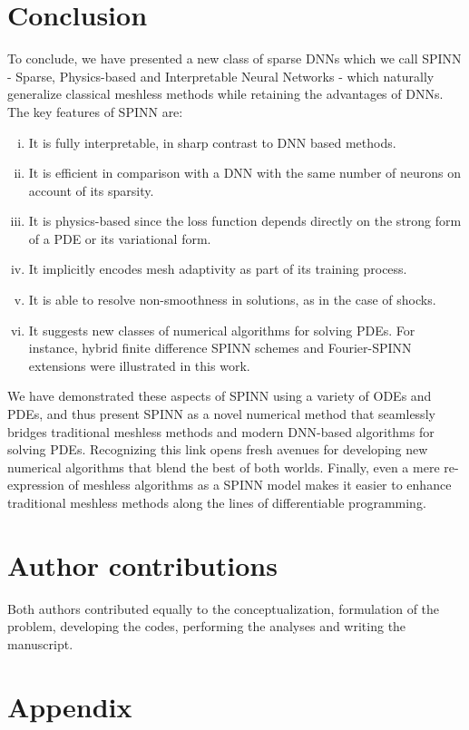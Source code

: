 \documentclass[12pt]{article}
\begin{document}
\section{Conclusion}
To conclude, we have presented a new class of sparse DNNs which we call SPINN - Sparse, Physics-based and Interpretable Neural Networks - which naturally generalize classical meshless methods while retaining the advantages of DNNs. The key features  of SPINN are:
\begin{enumerate}[(i)]
\item It is fully interpretable, in sharp contrast to DNN based methods.
\item It is efficient in comparison with a DNN with the same number of neurons on account of its sparsity.
\item It is physics-based since the loss function depends directly on the strong form of a PDE or its variational form.
\item It implicitly encodes mesh adaptivity as part of its training process.
\item It is able to resolve non-smoothness in solutions, as in the case of shocks.
\item It suggests new classes of numerical algorithms for solving PDEs. For instance, hybrid finite difference SPINN schemes and Fourier-SPINN extensions were illustrated in this work.
\end{enumerate}
We have demonstrated these aspects of SPINN using a variety of ODEs and PDEs, and thus present SPINN as a novel numerical method that seamlessly bridges traditional meshless methods and modern DNN-based algorithms for solving PDEs.  Recognizing this link opens fresh avenues for developing new numerical algorithms that blend the best of both worlds. Finally, even a mere re-expression of meshless algorithms as a SPINN model makes it easier to enhance traditional meshless methods along the lines of differentiable programming.


\section*{Author contributions}
Both authors contributed equally to the conceptualization, formulation of the problem, developing the codes, performing the analyses and writing the manuscript.




\newpage
\section*{Appendix}
\appendix
\end{document}
